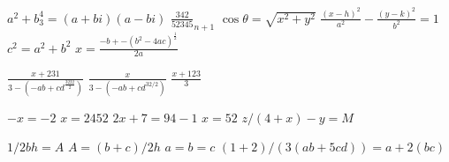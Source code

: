 \documentclass{article}
\begin{document}
$ a^2+b^4_3 = (a+bi)(a-bi) $
$ \frac{342}{52345}_{n+1} $
$ \cos\theta = \sqrt{x^2 + y^2} $
$ \frac{(x-h)^2}{a^2} - \frac{(y-k)^2}{b^2} = 1 $
$ c^2 = a^2 + b^2 $
$ x = \frac{-b+-(b^2-4ac)^{\frac{1}{2}}}{2a} $

$ \frac{x+231}{3-(-ab + cd^\frac{3222}{2})} $
$ \frac{x}{3-(-ab + cd^{32/2})} $
$ \frac{x+123}{3} $

$ -x = -2 $
$ x=2452 $ 
$ 2x + 7 = 94 - 1 $ 
$ x = 52 $ 
$ z/(4 + x) - y = M $

$ 1/2bh = A $
$ A = (b+c)/2h $
$ a=b=c $
$ (1+2)/(3(ab+5cd))=a+2(bc) $
\end{document}
